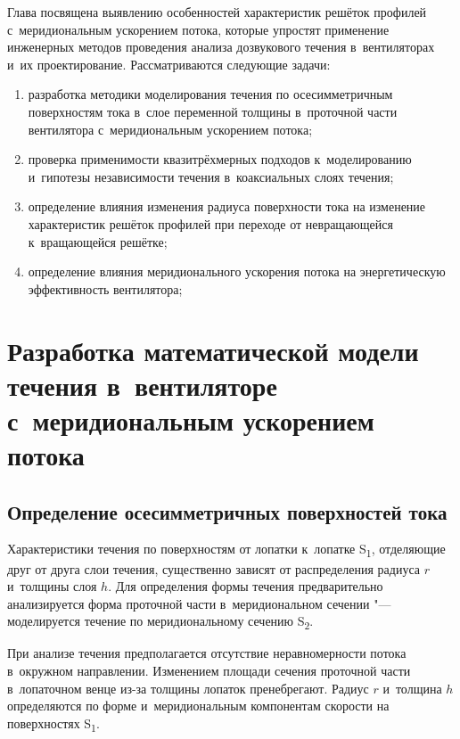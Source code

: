 Глава посвящена выявлению особенностей характеристик решёток профилей с~меридиональным ускорением потока, которые упростят применение инженерных методов проведения анализа дозвукового течения в~вентиляторах и~их проектирование.
Рассматриваются следующие задачи:
\begin{enumerate}
	\item разработка методики моделирования течения по осесимметричным поверхностям тока в~слое переменной толщины в~проточной части вентилятора с~меридиональным ускорением потока;
	\item проверка применимости квазитрёхмерных подходов к~моделированию и~гипотезы независимости течения в~коаксиальных слоях течения;
	\item определение влияния изменения радиуса поверхности тока на изменение характеристик решёток профилей при переходе от невращающейся к~вращающейся решётке;
	\item определение влияния меридионального ускорения потока на энергетическую эффективность вентилятора;
\end{enumerate}

\section{Разработка математической модели течения в~вентиляторе с~меридиональным ускорением потока}\label{sec:newModel}

\subsection{Определение осесимметричных поверхностей тока}\label{sec:RadialEquilibrium}

Характеристики течения по поверхностям от лопатки к~лопатке S\textsubscript{1}, отделяющие друг от друга слои течения, существенно зависят от распределения радиуса \(r\) и~толщины слоя \(h\).
Для определения формы течения предварительно анализируется форма проточной части в~меридиональном сечении "--- моделируется течение по меридиональному сечению S\textsubscript{2}.

При анализе течения предполагается отсутствие неравномерности потока в~окружном направлении.
Изменением площади сечения проточной части в~лопаточном венце из-за толщины лопаток пренебрегают.
Радиус \(r\) и~толщина \(h\) определяются по форме и~меридиональным компонентам скорости на поверхностях S\textsubscript{1}.

